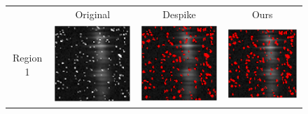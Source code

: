 \documentclass[10pt,letterpaper]{article}
\begin{document}
				\begin{figure}
					
					\centering
					\begin{tabular}{c c c c}
						& Original & Despike & Ours \\
						Region 1 & \includegraphics[width=1.75in]{fig/orig_1} & \includegraphics[width=1.75in]{fig/despike_1} & \includegraphics[width=1.75in]{fig/dspk_1} \\

\end{tabular}
\end{figure}
\end{document}
